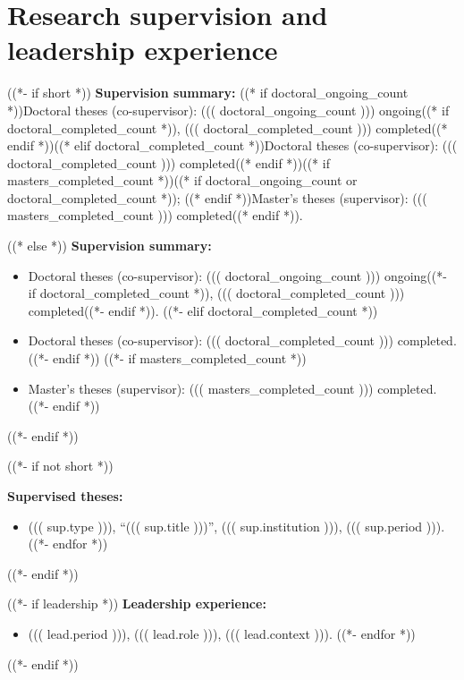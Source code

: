 \documentclass[a4paper,12pt]{article}
\begin{document}
\section*{Research supervision and leadership experience}

((*- if short *))
\textbf{Supervision summary:} ((* if doctoral_ongoing_count *))Doctoral theses (co-supervisor): ((( doctoral_ongoing_count ))) ongoing((* if doctoral_completed_count *)), ((( doctoral_completed_count ))) completed((* endif *))((* elif doctoral_completed_count *))Doctoral theses (co-supervisor): ((( doctoral_completed_count ))) completed((* endif *))((* if masters_completed_count *))((* if doctoral_ongoing_count or doctoral_completed_count *)); ((* endif *))Master's theses (supervisor): ((( masters_completed_count ))) completed((* endif *)).

((* else *))
\textbf{Supervision summary:}
\begin{itemize}
((*- if doctoral_ongoing_count *))
\item Doctoral theses (co-supervisor): ((( doctoral_ongoing_count ))) ongoing((*- if doctoral_completed_count *)), ((( doctoral_completed_count ))) completed((*- endif *)).
((*- elif doctoral_completed_count *))
\item Doctoral theses (co-supervisor): ((( doctoral_completed_count ))) completed.
((*- endif *))
((*- if masters_completed_count *))
\item Master's theses (supervisor): ((( masters_completed_count ))) completed.
((*- endif *))
\end{itemize}
((*- endif *))

((*- if not short *))

\textbf{Supervised theses:}
\begin{itemize}
((*- for sup in supervisions *))
\item ((( sup.type ))), ``((( sup.title )))'', ((( sup.institution ))), ((( sup.period ))).
((*- endfor *))
\end{itemize}
((*- endif *))

((*- if leadership *))
\textbf{Leadership experience:}
\begin{itemize}
((*- for lead in leadership *))
\item ((( lead.period ))), ((( lead.role ))), ((( lead.context ))).
((*- endfor *))
\end{itemize}
((*- endif *))

\end{document}
